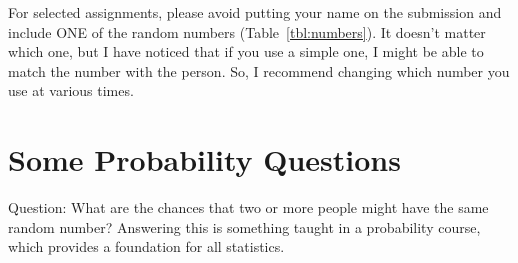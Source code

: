 \documentclass{article}\usepackage[]{graphicx}\usepackage[]{color}
\begin{document}
For selected assignments, please avoid putting your name on the submission and include ONE of the random numbers (Table~\ref{tbl:numbers}). It doesn't matter which one, but I have noticed that if you use a simple one, I might be able to match the number with the person. So, I recommend changing which number you use at various times.

\section*{Some Probability Questions}

Question: What are the chances that two or more people might have the same random number?  Answering this is something taught in a probability course, which provides a foundation for all statistics.
\end{document}
